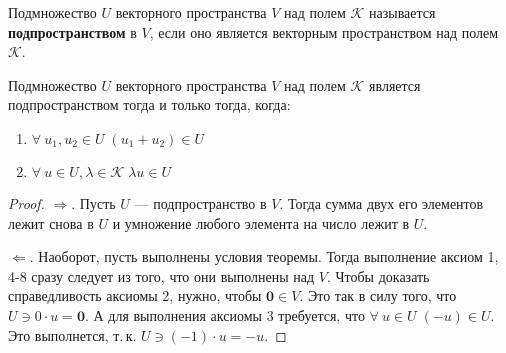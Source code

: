 \begin{definition}
    Подмножество $U$ векторного пространства $V$ над полем $\mathcal{K}$ называется \textbf{подпространством} в $V$, если оно является векторным пространством над полем $\mathcal{K}$.
\end{definition}

\begin{theorem}
    Подмножество $U$ векторного пространства $V$ над полем $\mathcal{K}$ является подпространством тогда и только тогда, когда:
    \begin{enumerate}
        \item $\forall\!\:u_1, u_2 \in U\; (u_1 + u_2) \in U$
        \item $\forall\!\: u \in U, \lambda \in \mathcal{K}\; \lambda u \in U$
    \end{enumerate}
\end{theorem}

\begin{proof}
    $\Rightarrow$. Пусть $U$ --- подпространство в $V$. Тогда сумма двух его элементов лежит снова в $U$ и умножение любого элемента на число лежит в $U$.

    $\Leftarrow$. Наоборот, пусть выполнены условия теоремы. Тогда выполнение аксиом 1, 4-8 сразу следует из того, что они выполнены над $V$. Чтобы доказать справедливость аксиомы 2, нужно, чтобы $\boldsymbol{0} \in V$. Это так в силу того, что $U \ni 0 \cdot u = \boldsymbol{0}$. А для выполнения аксиомы 3 требуется, что $\forall\!\:u \in U\;(-u) \in U$. Это выполнется, т.\,к. $U \ni (-1) \cdot u = -u$.
\end{proof}


